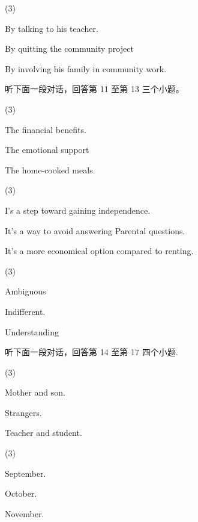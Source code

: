 \documentclass{英语试卷}
\begin{document}
\begin{choices}(3)
  \item By talking to his teacher.
  \item By quitting the community project
  \item By involving his family in community work.
\end{choices}
\par 听下面一段对话，回答第 11 至第 13 三个小题。\par
{}
\begin{choices}(3)
  \item The financial benefits.
  \item The emotional support
  \item The home-cooked meals.
\end{choices}
\begin{choices}(3)
  \item I's a step toward gaining independence.
  \item It's a way to avoid answering Parental questions.
  \item It's a more economical option compared to renting.
\end{choices}
\begin{choices}(3)
  \item Ambiguous
  \item Indifferent.
  \item Understanding
\end{choices}
\par 听下面一段对话，回答第 14 至第 17 四个小题.\par
{}
\begin{choices}(3)
  \item Mother and son.
  \item Strangers.
  \item Teacher and student.
\end{choices}
\begin{choices}(3)
  \item September.
  \item October.
  \item November.
\end{choices}
\end{document}

